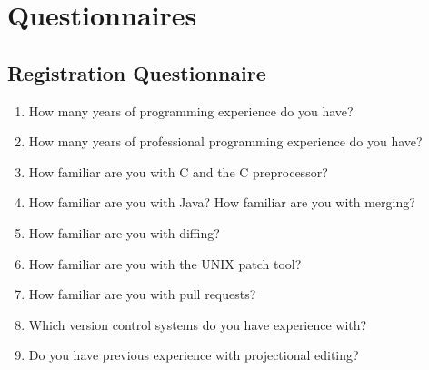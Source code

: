 \chapter{Questionnaires}\label{a:questionnaires}

\section{Registration Questionnaire}
\begin{enumerate}
    \item How many years of programming experience do you have?
    \item How many years of professional programming experience do you have?
    \item How familiar are you with C and the C preprocessor?
    \item How familiar are you with Java?	How familiar are you with merging?
    \item How familiar are you with diffing?
    \item How familiar are you with the UNIX patch tool?
    \item How familiar are you with pull requests?
    \item Which version control systems do you have experience with?
    \item Do you have previous experience with projectional editing?
\end{enumerate}


